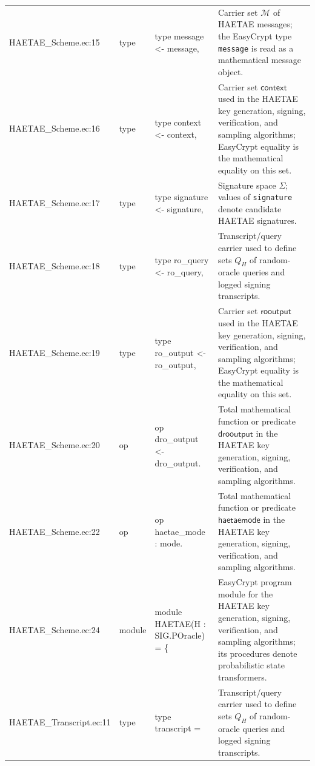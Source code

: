 \documentclass[10pt]{article}
\newcommand{\EC}[1]{\texttt{#1}}
\begin{document}
\begin{longtable}{L{0.11\textwidth}L{0.055\textwidth}L{0.385\textwidth}L{0.41\textwidth}}
HAETAE\_\allowbreak{}Scheme.\allowbreak{}ec:\allowbreak{}15 & type & {\ttfamily\scriptsize type message \textless{}- message,} & Carrier set $\mathcal M$ of HAETAE messages; the EasyCrypt type \EC{message} is read as a mathematical message object. \\
HAETAE\_\allowbreak{}Scheme.\allowbreak{}ec:\allowbreak{}16 & type & {\ttfamily\scriptsize type context \textless{}- context,} & Carrier set $\mathsf{context}$ used in the HAETAE key generation, signing, verification, and sampling algorithms; EasyCrypt equality is the mathematical equality on this set. \\
HAETAE\_\allowbreak{}Scheme.\allowbreak{}ec:\allowbreak{}17 & type & {\ttfamily\scriptsize type signature \textless{}- signature,} & Signature space $\Sigma$; values of \EC{signature} denote candidate HAETAE signatures. \\
HAETAE\_\allowbreak{}Scheme.\allowbreak{}ec:\allowbreak{}18 & type & {\ttfamily\scriptsize type ro\_\allowbreak{}query \textless{}- ro\_\allowbreak{}query,} & Transcript/query carrier used to define sets $Q_H$ of random-oracle queries and logged signing transcripts. \\
HAETAE\_\allowbreak{}Scheme.\allowbreak{}ec:\allowbreak{}19 & type & {\ttfamily\scriptsize type ro\_\allowbreak{}output \textless{}- ro\_\allowbreak{}output,} & Carrier set $\mathsf{rooutput}$ used in the HAETAE key generation, signing, verification, and sampling algorithms; EasyCrypt equality is the mathematical equality on this set. \\
HAETAE\_\allowbreak{}Scheme.\allowbreak{}ec:\allowbreak{}20 & op & {\ttfamily\scriptsize op dro\_\allowbreak{}output \textless{}- dro\_\allowbreak{}output.} & Total mathematical function or predicate $\mathsf{drooutput}$ in the HAETAE key generation, signing, verification, and sampling algorithms. \\
HAETAE\_\allowbreak{}Scheme.\allowbreak{}ec:\allowbreak{}22 & op & {\ttfamily\scriptsize op haetae\_\allowbreak{}mode : mode.} & Total mathematical function or predicate $\mathsf{haetaemode}$ in the HAETAE key generation, signing, verification, and sampling algorithms. \\
HAETAE\_\allowbreak{}Scheme.\allowbreak{}ec:\allowbreak{}24 & module & {\ttfamily\scriptsize module HAETAE(H : SIG.POracle) = \{} & EasyCrypt program module for the HAETAE key generation, signing, verification, and sampling algorithms; its procedures denote probabilistic state transformers. \\
HAETAE\_\allowbreak{}Transcript.\allowbreak{}ec:\allowbreak{}11 & type & {\ttfamily\scriptsize type transcript =} & Transcript/query carrier used to define sets $Q_H$ of random-oracle queries and logged signing transcripts. \\

\end{longtable}
\end{document}
